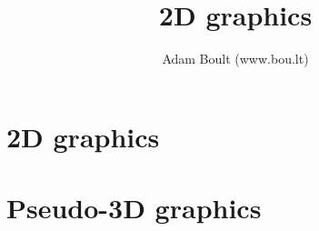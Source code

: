 \documentclass[oneside]{book}
\begin{document}
\author{Adam Boult (www.bou.lt)}
\title{2D graphics}
\maketitle

\setcounter{tocdepth}{0}
\tableofcontents



\part{2D graphics}







\part{Pseudo-3D graphics}


\end{document}
